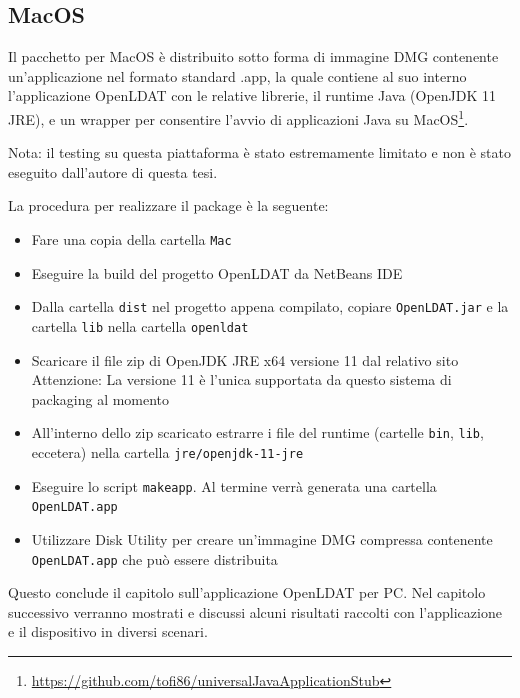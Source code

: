 \subsection{MacOS}
Il pacchetto per MacOS è distribuito sotto forma di immagine DMG contenente un'applicazione nel formato standard .app, la quale contiene al suo interno l'applicazione OpenLDAT con le relative librerie, il runtime Java (OpenJDK 11 JRE), e un wrapper per consentire l'avvio di applicazioni Java su MacOS\footnote{\href{https://github.com/tofi86/universalJavaApplicationStub}{https://github.com/tofi86/universalJavaApplicationStub}}.

Nota: il testing su questa piattaforma è stato estremamente limitato e non è stato eseguito dall'autore di questa tesi.

La procedura per realizzare il package è la seguente:\begin{itemize}
	\item Fare una copia della cartella \texttt{Mac}
	\item Eseguire la build del progetto OpenLDAT da NetBeans IDE
	\item Dalla cartella \texttt{dist} nel progetto appena compilato, copiare \texttt{OpenLDAT.jar} e la cartella \texttt{lib} nella cartella \texttt{openldat}
	\item Scaricare il file zip di OpenJDK JRE x64 versione 11 dal relativo sito\\
	Attenzione: La versione 11 è l'unica supportata da questo sistema di packaging al momento
	\item All'interno dello zip scaricato estrarre i file del runtime (cartelle \texttt{bin}, \texttt{lib}, eccetera) nella cartella \texttt{jre/openjdk-11-jre}
	\item Eseguire lo script \texttt{makeapp}. Al termine verrà generata una cartella \texttt{OpenLDAT.app}
	\item Utilizzare Disk Utility per creare un'immagine DMG compressa contenente \texttt{OpenLDAT.app} che può essere distribuita
\end{itemize}

Questo conclude il capitolo sull'applicazione OpenLDAT per PC. Nel capitolo successivo verranno mostrati e discussi alcuni risultati raccolti con l'applicazione e il dispositivo in diversi scenari.

